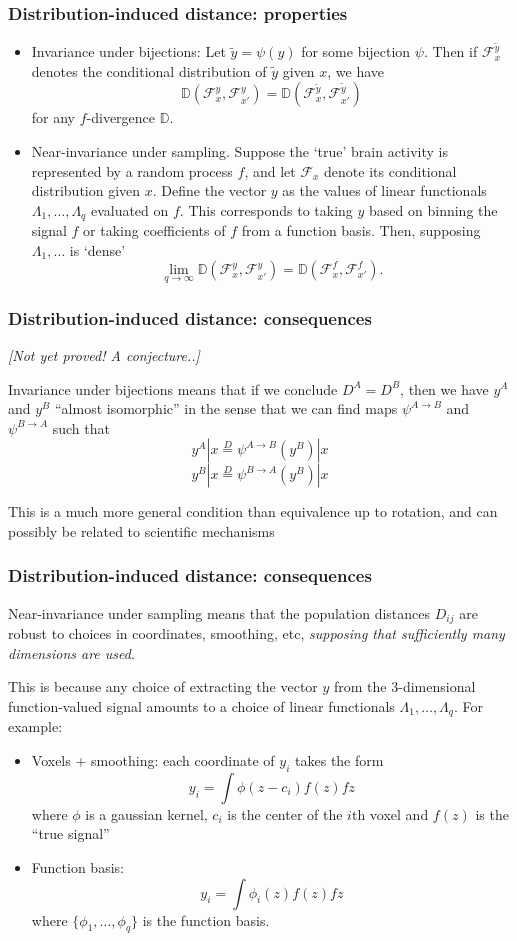 \documentclass{beamer}
\begin{document}
\begin{frame}
\frametitle{Distribution-induced distance: properties}
\begin{itemize}
\item Invariance under bijections:  Let $\tilde{y} = \psi(y)$ for some bijection $\psi$.  Then if $\mathcal{F}_x^{\tilde{y}}$ denotes the conditional distribution of $\tilde{y}$ given $x$, we have
\[
\mathbb{D}(\mathcal{F}_x^y, \mathcal{F}_{x'}^y) = \mathbb{D}(\mathcal{F}_x^{\tilde{y}}, \mathcal{F}_{x'}^{\tilde{y}})
\]
for any $f$-divergence $\mathbb{D}$.
\item Near-invariance under sampling.  Suppose the `true' brain activity is represented by a random process $f$, and let $\mathcal{F}_x$ denote its conditional distribution given $x$.  Define the vector $y$ as the values of linear functionals $\Lambda_1,\hdots, \Lambda_q$ evaluated on $f$.  This corresponds to taking $y$ based on binning the signal $f$ or taking coefficients of $f$ from a function basis.  Then, supposing $\Lambda_1,\hdots$ is `dense'
\[
\lim_{q \to \infty} \mathbb{D}(\mathcal{F}_x^y, \mathcal{F}_{x'}^y) = \mathbb{D}(\mathcal{F}_x^f, \mathcal{F}_{x'}^f).
\]
\end{itemize}
\end{frame}

\begin{frame}
\frametitle{Distribution-induced distance: consequences}
\emph{[Not yet proved!  A conjecture..]}

Invariance under bijections means that if we conclude $D^A = D^B$, then we have
$y^A$ and $y^B$ ``almost isomorphic'' in the sense that we can find maps $\psi^{A\to B}$ and $\psi^{B \to A}$ such that
\[
y^A|x \stackrel{D}{=} \psi^{A\to B}(y^B)|x
\]
\[
y^B|x \stackrel{D}{=} \psi^{B\to A}(y^B)|x
\]

This is a much more general condition than equivalence up to rotation, and can possibly be related to scientific mechanisms
\end{frame}

\begin{frame}
\frametitle{Distribution-induced distance: consequences}
Near-invariance under sampling means that the population distances
$D_{ij}$ are robust to choices in coordinates, smoothing, etc,
\emph{supposing that sufficiently many dimensions are used}.

This is because any choice of extracting the vector $y$ from the 3-dimensional function-valued signal
amounts to a choice of linear functionals $\Lambda_1,\hdots, \Lambda_q$.  For example:
\begin{itemize}
\item Voxels + smoothing: each coordinate of $y_i$ takes the form
\[
y_i = \int \phi(z - c_i) f(z) fz
\]
where $\phi$ is a gaussian kernel, $c_i$ is the center of the $i$th voxel and $f(z)$ is the ``true signal''
\item Function basis:
\[
y_i = \int \phi_i(z) f(z) fz
\]
where $\{\phi_1,\hdots, \phi_q\}$ is the function basis.
\end{itemize}
\end{frame}
\end{document}
